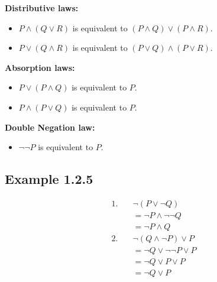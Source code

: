 \documentclass{article} %
\begin{document}
    \textbf{Distributive laws:}
    \begin{itemize}[itemsep=5pt,parsep=0pt,topsep=5pt]
        \item \begin{center}$P \land (Q \lor R)$ is equivalent to $(P \land Q) \lor (P \land R)$.\end{center}
        \item \begin{center}$P \lor (Q \land R)$ is equivalent to $(P \lor Q) \land (P \lor R)$.\end{center}
    \end{itemize}
    
    \textbf{Absorption laws:}
    \begin{itemize}[itemsep=5pt,parsep=0pt,topsep=5pt]
        \item \begin{center}$P \lor (P \land Q)$ is equivalent to $P$.\end{center}
        \item \begin{center}$P \land (P \lor Q)$ is equivalent to $P$.\end{center}
    \end{itemize}
    
    \textbf{Double Negation law:}
    \begin{itemize}[itemsep=5pt,parsep=0pt,topsep=5pt]
        \item \begin{center}$\neg\neg P$ is equivalent to $P$.\end{center}
    \end{itemize}
    
    \subsection*{Example 1.2.5}

    \begin{align*}
        1. &\quad \neg (P \lor \neg Q) \\
        &\quad = \neg P \land \neg \neg Q \\
        &\quad = \neg P \land Q \\
        2. &\quad \neg (Q \land \neg P) \lor P \\
        &\quad = \neg Q \lor \neg \neg P \lor P \\
        &\quad = \neg Q \lor P \lor P \\
        &\quad = \neg Q \lor P \\
    \end{align*}
\end{document}
